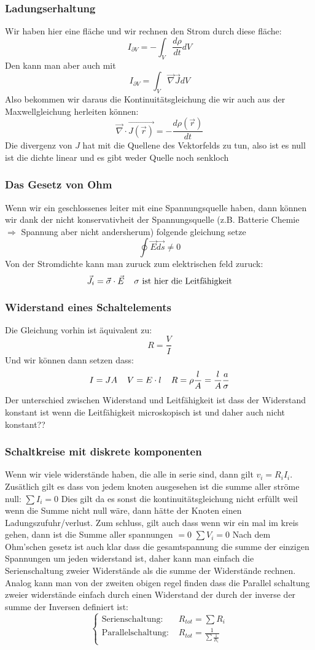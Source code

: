 \documentclass{article}
\newcommand{\mspc}{\hspace{0.4cm}}
\begin{document}
\subsubsection{Ladungserhaltung}
Wir haben hier eine fläche und wir rechnen den Strom durch diese fläche:\[I_{\partial V}=-\int_V\frac{d \rho}{dt}dV\]
Den kann man aber auch mit \[I_{\partial V}=\int_V\vec{\nabla}\vec{J}dV\]
Also bekommen wir daraus die Kontinuitätsgleichung die wir auch aus der Maxwellgleichung herleiten können:\[\vec{\nabla}\cdot\vec{J(\vec{r})}=-\frac{d\rho(\vec{r})}{dt}\] Die divergenz von $J$ hat mit die Quellene des Vektorfelds zu tun, also ist es null
ist die dichte linear und es gibt weder Quelle noch senkloch
\subsubsection{Das Gesetz von Ohm}
Wenn wir ein geschlossenes leiter mit eine Spannungsquelle haben, dann können wir dank der nicht konservativheit der Spannungsquelle (z.B. Batterie Chemie $\Rightarrow$ Spannung aber nicht andersherum) folgende gleichung setze
\[\oint\vec{E}\vec{ds}\neq0\]
Von der Stromdichte kann man zuruck zum elektrischen feld zuruck:\[\vec{J_i}=\vec{\sigma}\cdot\vec{E}\mspc\sigma\text{ ist hier die Leitfähigkeit}\]
\subsubsection{Widerstand eines Schaltelements}
Die Gleichung vorhin ist äquivalent zu:\[R=\frac{V}{I}\]Und wir können dann setzen dass:\[I=JA\mspc V=E\cdot l\mspc R=\rho\frac{l}{A}=\frac{l}{A}\frac{a}{\sigma}\]
Der unterschied zwischen Widerstand und Leitfähigkeit ist dass der Widerstand konstant ist wenn die Leitfähigkeit microskopisch ist und daher auch nicht konstant??
\subsubsection{Schaltkreise mit diskrete komponenten} Wenn wir viele widerstände haben, die alle in serie sind, dann gilt $v_i=R_iI_i$. Zusätlich gilt es dass von jedem knoten ausgesehen ist die summe aller ströme null: $\sum I_i=0$ Dies gilt da es sonst die kontinuitätsgleichung nicht erfüllt weil wenn die Summe nicht null wäre, dann
hätte der Knoten einen Ladungszufuhr/verlust.
Zum schluss, gilt auch dass wenn wir ein mal im kreis gehen, dann ist die Summe aller spannungen $=0$ $\sum V_i=0$
\newline Nach dem Ohm'schen gesetz ist auch klar dass die gesamtspannung die summe der einzigen Spannungen um jeden widerstand ist, daher kann man einfach die Serienschaltung zweier Widerstände als die summe der Widerstände rechnen. Analog kann man von der zweiten obigen regel 
finden dass die Parallel schaltung zweier widerstände einfach durch einen Widerstand der durch der inverse der summe der Inversen definiert ist:
\[\left\lbrace\begin{matrix}\text{Serienschaltung: }&R_{tot}=\sum R_i\\\text{Parallelschaltung: }&R_{tot}=\frac{1}{\sum \frac{1}{R_i}}\end{matrix}\right.\]
\end{document}
